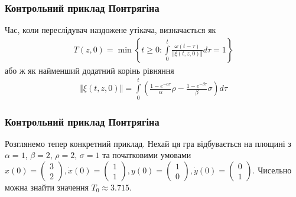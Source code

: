 \documentclass[10pt,pdf]{beamer}
\renewcommand{\d}[1]{\dot{#1}}
\renewcommand{\l}{\left}
\renewcommand{\r}{\right}
\newcommand{\norm}[1]{\left\Vert #1 \right\Vert}
\newcommand{\intl}{\int\limits}
\begin{document}
    \begin{frame}
        \frametitle{Контрольний приклад Понтрягіна}
    
        Час, коли переслідувач наздожене утікача, визначається як
        \begin{gather*}
            T(z, 0) = \min \l\{ t\geq 0 : \intl_0^t \frac{\omega(t-\tau)}{\norm{\xi(t, z, 0)}} d\tau = 1 \r\}
        \end{gather*}
        або ж як найменший додатний корінь рівняння
        \begin{gather*}
            \norm{\xi(t, z, 0)} = \intl_0^t \l(\frac{1 - e^{-\alpha \tau}}{\alpha} \rho - \frac{1 - e^{-\beta \tau}}{\beta} \sigma\r) d\tau
        \end{gather*}
    
    \end{frame}
    \begin{frame}
        \frametitle{Контрольний приклад Понтрягіна}
    
        Розглянемо тепер конкретний приклад. Нехай ця гра відбувається на площині з 
        $\alpha=1$, $\beta=2$, $\rho=2$, $\sigma=1$ та
        початковими умовами $x(0) = \begin{pmatrix}
            3 \\ 2
        \end{pmatrix}, \d{x}(0) = \begin{pmatrix}
            1 \\ 1
        \end{pmatrix}, y(0) = \begin{pmatrix}
            1 \\ 0
        \end{pmatrix}, \d{y}(0) = \begin{pmatrix}
            0 \\ 1
        \end{pmatrix}$.
        Чисельно можна знайти значення $T_0 \approx 3.715$.
        \begin{center}
            \resizebox{160pt}{!}{
                
            }
        \end{center}
    
    \end{frame}
\end{document}
